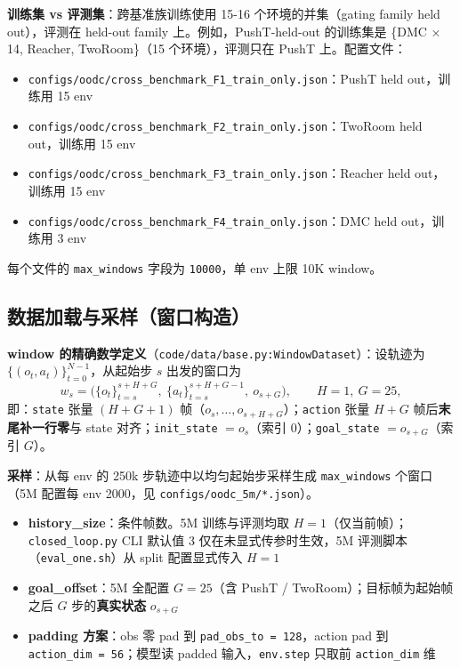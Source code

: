 \documentclass[11pt,a4paper]{article}
\begin{document}
\textbf{训练集 vs 评测集}：跨基准族训练使用 15-16 个环境的并集（gating family held out），评测在 held-out family 上。例如，PushT-held-out 的训练集是 \{DMC × 14, Reacher, TwoRoom\}（15 个环境），评测只在 PushT 上。配置文件：
\begin{itemize}[leftmargin=2em]
    \item \texttt{configs/oodc/cross\_benchmark\_F1\_train\_only.json}：PushT held out，训练用 15 env
    \item \texttt{configs/oodc/cross\_benchmark\_F2\_train\_only.json}：TwoRoom held out，训练用 15 env
    \item \texttt{configs/oodc/cross\_benchmark\_F3\_train\_only.json}：Reacher held out，训练用 15 env
    \item \texttt{configs/oodc/cross\_benchmark\_F4\_train\_only.json}：DMC held out，训练用 3 env
\end{itemize}
每个文件的 \texttt{max\_windows} 字段为 \texttt{10000}，单 env 上限 10K window。

\subsection{数据加载与采样（窗口构造）}

\textbf{window 的精确数学定义}（\texttt{code/data/base.py:WindowDataset}）：设轨迹为 $\{(o_t, a_t)\}_{t=0}^{N-1}$，从起始步 $s$ 出发的窗口为
\[
w_s = \big( \{o_t\}_{t=s}^{s+H+G},\ \{a_t\}_{t=s}^{s+H+G-1},\ o_{s+G} \big),\qquad H=1,\ G=25,
\]
即：\texttt{state} 张量 $(H{+}G{+}1)$ 帧（$o_s, \ldots, o_{s+H+G}$）；\texttt{action} 张量 $H{+}G$ 帧后\textbf{末尾补一行零}与 state 对齐；\texttt{init\_state} $= o_s$（索引 0）；\texttt{goal\_state} $= o_{s+G}$（索引 $G$）。

\textbf{采样}：从每 env 的 250k 步轨迹中以均匀起始步采样生成 \texttt{max\_windows} 个窗口（5M 配置每 env 2000，见 \texttt{configs/oodc\_5m/*.json}）。
\begin{itemize}[leftmargin=2em]
    \item \textbf{history\_size}：条件帧数。5M 训练与评测均取 $H=1$（仅当前帧）；\texttt{closed\_loop.py} CLI 默认值 3 仅在未显式传参时生效，5M 评测脚本（\texttt{eval\_one.sh}）从 split 配置显式传入 $H=1$
    \item \textbf{goal\_offset}：5M 全配置 $G=25$（含 PushT / TwoRoom）；目标帧为起始帧之后 $G$ 步的\textbf{真实状态} $o_{s+G}$
    \item \textbf{padding 方案}：obs 零 pad 到 \texttt{pad\_obs\_to = 128}，action pad 到 \texttt{action\_dim = 56}；模型读 padded 输入，\texttt{env.step} 只取前 \texttt{action\_dim} 维
\end{itemize}
\end{document}
